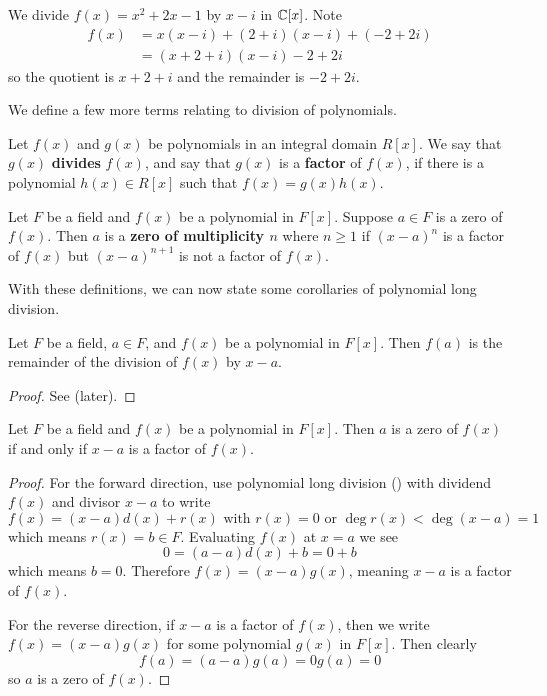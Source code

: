 \begin{example}
    We divide $f(x) = x^2 + 2x - 1$ by $x-i$ in $\mathbb{C}[x]$. Note
    \begin{align*}
        f(x) &= x(x-i) + (2+i)(x-i) + (-2+2i)\\
        &= (x+2+i)(x-i) - 2 + 2i
    \end{align*}
    so the quotient is $x+2+i$ and the remainder is $-2+2i$.
\end{example}

We define a few more terms relating to division of polynomials.
\begin{definition}
    Let $f(x)$ and $g(x)$ be polynomials in an integral domain $R[x]$. We say that $g(x)$ \textbf{divides} $f(x)$, and say that $g(x)$ is a \textbf{factor} of $f(x)$, if there is a polynomial $h(x) \in R[x]$ such that $f(x) = g(x)h(x)$.
\end{definition}
\begin{definition}
    Let $F$ be a field and $f(x)$ be a polynomial in $F[x]$. Suppose $a \in F$ is a zero of $f(x)$. Then $a$ is a \textbf{zero of multiplicity $n$} where $n \geq 1$ if $(x-a)^n$ is a factor of $f(x)$ but $(x-a)^{n+1}$ is not a factor of $f(x)$.
\end{definition}

With these definitions, we can now state some corollaries of polynomial long division.

\begin{corollary}\label{corollary-remainder-theorem}
    Let $F$ be a field, $a \in F$, and $f(x)$ be a polynomial in $F[x]$. Then $f(a)$ is the remainder of the division of $f(x)$ by $x-a$.
\end{corollary}
\begin{proof}
    See  (later).
\end{proof}

\begin{corollary}\label{corollary-factor-theorem}
    Let $F$ be a field and $f(x)$ be a polynomial in $F[x]$. Then $a$ is a zero of $f(x)$ if and only if $x-a$ is a factor of $f(x)$.
\end{corollary}
\begin{proof}
    For the forward direction, use polynomial long division () with dividend $f(x)$ and divisor $x-a$ to write
    \[
        f(x) = (x-a)d(x) + r(x) \text{ with } r(x) = 0 \text{ or } \deg r(x) < \deg(x-a) = 1
    \]
    which means $r(x) = b \in F$. Evaluating $f(x)$ at $x = a$ we see
    \[
        0 = (a-a)d(x) + b = 0 + b
    \]
    which means $b = 0$. Therefore $f(x) = (x-a)g(x)$, meaning $x-a$ is a factor of $f(x)$.

    For the reverse direction, if $x - a$ is a factor of $f(x)$, then we write $f(x) = (x-a)g(x)$ for some polynomial $g(x)$ in $F[x]$. Then clearly
    \[
        f(a) = (a-a)g(a) = 0g(a) = 0
    \]
    so $a$ is a zero of $f(x)$.
\end{proof}

